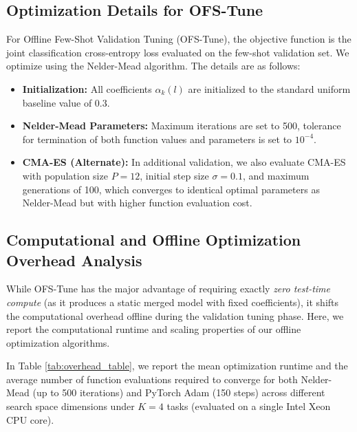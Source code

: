 \documentclass{article}
\theoremstyle{plain}
\theoremstyle{definition}
\theoremstyle{remark}
\begin{document}
\subsection{Optimization Details for OFS-Tune}
For Offline Few-Shot Validation Tuning (OFS-Tune), the objective function is the joint classification cross-entropy loss evaluated on the few-shot validation set. We optimize using the Nelder-Mead algorithm. The details are as follows:
\begin{itemize}
    \item \textbf{Initialization:} All coefficients $\alpha_k(l)$ are initialized to the standard uniform baseline value of 0.3.
    \item \textbf{Nelder-Mead Parameters:} Maximum iterations are set to 500, tolerance for termination of both function values and parameters is set to $10^{-4}$.
    \item \textbf{CMA-ES (Alternate):} In additional validation, we also evaluate CMA-ES with population size $P=12$, initial step size $\sigma=0.1$, and maximum generations of 100, which converges to identical optimal parameters as Nelder-Mead but with higher function evaluation cost.
\end{itemize}

\subsection{Computational and Offline Optimization Overhead Analysis}
While OFS-Tune has the major advantage of requiring exactly \emph{zero test-time compute} (as it produces a static merged model with fixed coefficients), it shifts the computational overhead offline during the validation tuning phase. Here, we report the computational runtime and scaling properties of our offline optimization algorithms.

In Table \ref{tab:overhead_table}, we report the mean optimization runtime and the average number of function evaluations required to converge for both Nelder-Mead (up to 500 iterations) and PyTorch Adam (150 steps) across different search space dimensions under $K=4$ tasks (evaluated on a single Intel Xeon CPU core).
\end{document}
